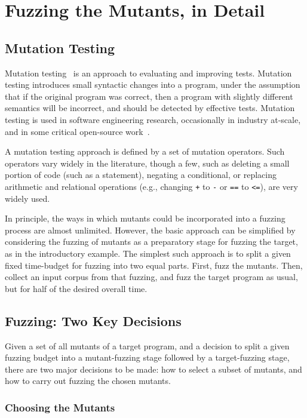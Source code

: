 \section{Fuzzing the Mutants, in Detail}


\subsection{Mutation Testing}

Mutation
testing~\cite{MutationSurvey,budd1979mutation,demillo1978hints} is an
approach to evaluating and improving tests.  Mutation testing
introduces small syntactic changes into a program, under the
assumption that if the original program was correct, then a program
with slightly different semantics will be incorrect, and should be
detected by effective tests.  Mutation testing is used in software
engineering research, occasionally in industry at-scale, and in some
critical open-source work~\cite{mutKernel,mutGoogle,mutFacebook}.

A mutation testing approach is defined by a set of mutation operators.
Such operators vary widely in the literature, though a few, such as
deleting a small portion of code (such as a statement), negating a
conditional, or replacing arithmetic and relational operations (e.g.,
changing {\tt +} to {\tt -} or {\tt ==} to {\tt <=}), are very widely
used.


In principle, the ways in which mutants could be incorporated into a
fuzzing process are almost unlimited.  However, the basic approach can
be simplified by considering the fuzzing of mutants as a preparatory
stage for fuzzing the target, as in the introductory example.  The
simplest such approach is to split a given fixed time-budget for
fuzzing into two equal parts.
First, fuzz the mutants.  Then, collect an input corpus from that
fuzzing, and fuzz the target program as usual, but for half of the
desired overall time.

\subsection{Fuzzing: Two Key Decisions}

Given a set of all mutants of a target program, and a decision to
split a given fuzzing budget into a mutant-fuzzing stage followed by a
target-fuzzing stage, there are two major decisions to be made: how to
select a subset of mutants, and how to carry out fuzzing the chosen
mutants.

\subsubsection{Choosing the Mutants}

